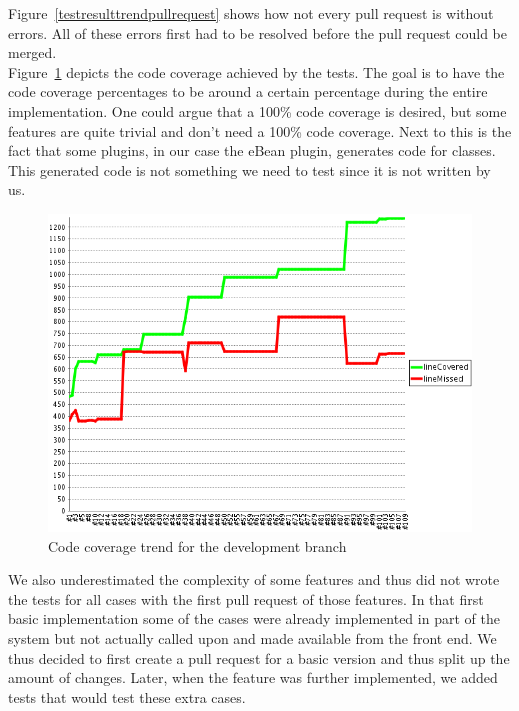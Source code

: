 Figure~\ref{testresulttrendpullrequest} shows how not every pull request is without errors.
All of these errors first had to be resolved before the pull request could be merged.\\

Figure~\ref{codecoveragetrenddev} depicts the code coverage achieved by the tests.
The goal is to have the code coverage percentages to be around a certain percentage during the entire implementation.
One could argue that a 100\% code coverage is desired, but some features are quite trivial and don't need a 100\% code coverage.
Next to this is the fact that some plugins, in our case the eBean plugin, generates code for classes.
This generated code is not something we need to test since it is not written by us.\\

\begin{figure}[H]
    \centering
    \includegraphics[width=\textwidth]{images/CodeCoverageTrendDev2}
    \caption{Code coverage trend for the development branch}
    \label{codecoveragetrenddev}
\end{figure}

We also underestimated the complexity of some features and thus did not wrote the tests for all cases with the first pull request of those features.
In that first basic implementation some of the cases were already implemented in part of the system but not actually called upon and made available from the front end.
We thus decided to first create a pull request for a basic version and thus split up the amount of changes.
Later, when the feature was further implemented, we added tests that would test these extra cases.

